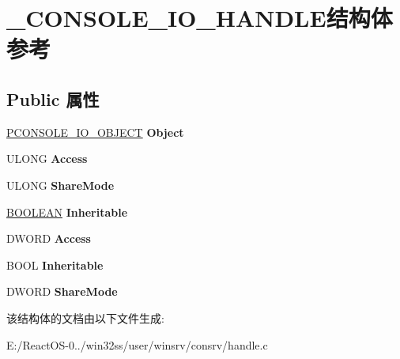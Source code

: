 \hypertarget{struct___c_o_n_s_o_l_e___i_o___h_a_n_d_l_e}{}\section{\+\_\+\+C\+O\+N\+S\+O\+L\+E\+\_\+\+I\+O\+\_\+\+H\+A\+N\+D\+L\+E结构体 参考}
\label{struct___c_o_n_s_o_l_e___i_o___h_a_n_d_l_e}
\subsection*{Public 属性}
\begin{DoxyCompactItemize}
\item 
\mbox{\label{struct___c_o_n_s_o_l_e___i_o___h_a_n_d_l_e_aded062502b8af29c10f983ef67ff6e0d}} 
\hyperlink{struct___c_o_n_s_o_l_e___i_o___o_b_j_e_c_t}{P\+C\+O\+N\+S\+O\+L\+E\+\_\+\+I\+O\+\_\+\+O\+B\+J\+E\+CT} {\bfseries Object}
\item 
\mbox{\label{struct___c_o_n_s_o_l_e___i_o___h_a_n_d_l_e_a51a6a64536d5a8695579f75059475062}} 
U\+L\+O\+NG {\bfseries Access}
\item 
\mbox{\label{struct___c_o_n_s_o_l_e___i_o___h_a_n_d_l_e_ae4e155e0d525859995f4f897ba755471}} 
U\+L\+O\+NG {\bfseries Share\+Mode}
\item 
\mbox{\label{struct___c_o_n_s_o_l_e___i_o___h_a_n_d_l_e_a4146d3255dc463d20d82500e6bb7d7eb}} 
\hyperlink{_processor_bind_8h_a112e3146cb38b6ee95e64d85842e380a}{B\+O\+O\+L\+E\+AN} {\bfseries Inheritable}
\item 
\mbox{\label{struct___c_o_n_s_o_l_e___i_o___h_a_n_d_l_e_a7e6d691c5e877dabcdc62a7f0a1d4f05}} 
D\+W\+O\+RD {\bfseries Access}
\item 
\mbox{\label{struct___c_o_n_s_o_l_e___i_o___h_a_n_d_l_e_a47894b2849d561db46a954d40e8f17ef}} 
B\+O\+OL {\bfseries Inheritable}
\item 
\mbox{\label{struct___c_o_n_s_o_l_e___i_o___h_a_n_d_l_e_a18aff311948b6ce4ffa4577949ff7284}} 
D\+W\+O\+RD {\bfseries Share\+Mode}
\end{DoxyCompactItemize}


该结构体的文档由以下文件生成\+:\begin{DoxyCompactItemize}
\item 
E\+:/\+React\+O\+S-\/0../win32ss/user/winsrv/consrv/handle.\+c\end{DoxyCompactItemize}
